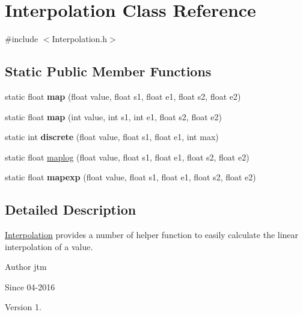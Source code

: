 \hypertarget{classInterpolation}{\section{Interpolation Class Reference}
\label{classInterpolation}
}


{\ttfamily \#include $<$Interpolation.\-h$>$}

\subsection*{Static Public Member Functions}
\begin{DoxyCompactItemize}
\item 
\hypertarget{classInterpolation_adfd3003c39c40ec76342274c65017761}{static float {\bfseries map} (float value, float s1, float e1, float s2, float e2)}\label{classInterpolation_adfd3003c39c40ec76342274c65017761}

\item 
\hypertarget{classInterpolation_ac6eab12deb9f79b79200aad3b219e7c3}{static float {\bfseries map} (int value, int s1, int e1, float s2, float e2)}\label{classInterpolation_ac6eab12deb9f79b79200aad3b219e7c3}

\item 
\hypertarget{classInterpolation_a246c72a835822b7674758d657ed44230}{static int {\bfseries discrete} (float value, float s1, float e1, int max)}\label{classInterpolation_a246c72a835822b7674758d657ed44230}

\item 
static float \hyperlink{classInterpolation_a5549f8859f14153da891222a8ff1a22f}{maplog} (float value, float s1, float e1, float s2, float e2)
\item 
\hypertarget{classInterpolation_a08d1fe5e82708ab26a019e9ae9f851c8}{static float {\bfseries mapexp} (float value, float s1, float e1, float s2, float e2)}\label{classInterpolation_a08d1fe5e82708ab26a019e9ae9f851c8}

\end{DoxyCompactItemize}


\subsection{Detailed Description}
\hyperlink{classInterpolation}{Interpolation} provides a number of helper function to easily calculate the linear interpolation of a value.

\begin{DoxyAuthor}{Author}
jtm 
\end{DoxyAuthor}
\begin{DoxySince}{Since}
04-\/2016 
\end{DoxySince}
\begin{DoxyVersion}{Version}
1. 
\end{DoxyVersion}


